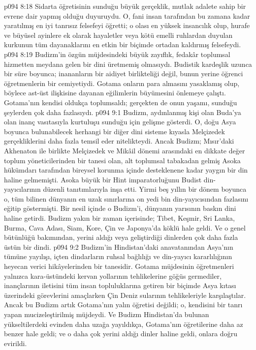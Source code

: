 \vs p094 8:18 Sidarta öğretisinin sunduğu büyük gerçeklik, mutlak adalete sahip bir evrene dair yapmış olduğu duyuruydu. O, fani insan tarafından bu zamana kadar yaratılmış en iyi tanrısız felsefeyi öğretti; o olası en yüksek insancılık olup, hurafe ve büyüsel ayinlere ek olarak hayaletler veya kötü emelli ruhlardan duyulan kurkunun tüm dayanaklarını en etkin bir biçimde ortadan kaldırmış felsefeydi.
\vs p094 8:19 Budizm’in özgün müjdesindeki büyük zayıflık, fedakâr toplumsal hizmetten meydana gelen bir dini üretmemiş olmasıydı. Budistik kardeşlik uzunca bir süre boyunca; inananların bir aidiyet birlikteliği değil, bunun yerine öğrenci öğretmenlerin bir cemiyetiydi. Gotama onların para almasını yasaklamış olup, böylece ast\hyp{}üst ilişkisine dayanan eğilimlerin büyümesini önlemeye çalıştı. Gotama’nın kendisi oldukça toplumsaldı; gerçekten de onun yaşamı, sunduğu şeylerden çok daha fazlasıydı.
\vs p094 9:1 Budizm, aydınlanmış kişi olan Buda’ya olan inanç vasıtasıyla kurtuluşu sunduğu için gelişme gösterdi. O, doğu Asya boyunca bulunabilecek herhangi bir diğer dini sisteme kıyasla Melçizedek gerçekliklerini daha fazla temsil eder nitelikteydi. Ancak Budizm; Mısır’daki Akhenaton ile birlikte Melçizedek ve Mikâil dönemi arasındaki en dikkate değer toplum yöneticilerinden bir tanesi olan, alt toplumsal tabakadan gelmiş Asoka hükümdarı tarafından bireysel korunma içinde desteklenene kadar yaygın bir din haline gelmemişti. Asoka büyük bir Hint imparatorluğunu Budist din\hyp{}yayıcılarının düzenli tanıtımlarıyla inşa etti. Yirmi beş yıllın bir dönem boyunca o, tüm bilinen dünyanın en uzak sınırlarına on yedi bin din\hyp{}yayıcısından fazlasını eğitip göstermişti. Bir nesil içinde o Budizm’i, dünyanın yarısının baskın dini haline getirdi. Budizm yakın bir zaman içerisinde; Tibet, Keşmir, Sri Lanka, Burma, Cava Adası, Siam, Kore, Çin ve Japonya’da köklü hale geldi. Ve o genel bütünlüğü bakımından, yerini aldığı veya geliştirdiği dinlerden çok daha fazla üstün bir dindi.
\vs p094 9:2 Budizm’in Hindistan’daki anavatanından Asya’nın tümüne yayılışı, içten dindarların ruhsal bağlılığı ve din\hyp{}yayıcı kararlılığının heyecan verici hikâyelerinden bir tanesidir. Gotama müjdesinin öğretmenleri yalnızca kara\hyp{}üstündeki kervan yollarının tehlikelerine göğüs germediler, inançlarının iletisini tüm insan topluluklarına getiren bir biçimde Asya kıtası üzerindeki görevlerini amaçlarken Çin Deniz sularının tehlikeleriyle karşılaştılar. Ancak bu Budizm artık Gotama’nın yalın öğretisi değildi; o, kendisini bir tanrı yapan mucizeleştirilmiş müjdeydi. Ve Budizm Hindistan’da bulunan yükseltilerdeki evinden daha uzağa yayıldıkça, Gotama’nın öğretilerine daha az benzer hale geldi; ve o daha çok yerini aldığı dinler haline geldi, onlara doğru evirildi.
